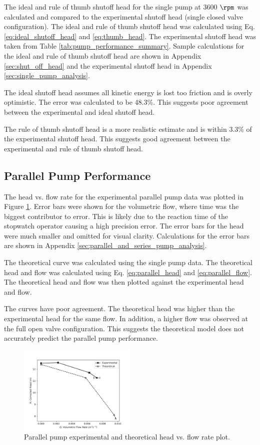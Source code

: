 \noindent The ideal and rule of thumb shutoff head for the single pump at 3600 $\unit{\rpm}$ was calculated and compared to the experimental shutoff head (single closed valve configuration). The ideal and rule of thumb shutoff head was calculated using Eq. \ref{eq:ideal_shutoff_head} and \ref{eq:thumb_head}. The experimental shutoff head was taken from Table \ref{tab:pump_performance_summary}. Sample calculations for the ideal and rule of thumb shutoff head are shown in Appendix \ref{sec:shut_off_head} and the experimental shutoff head in Appendix \ref{sec:single_pump_analysis}.

The ideal shutoff head assumes all kinetic energy is lost too friction and is overly optimistic. The error was calculated to be 48.3\%. This suggests poor agreement between the experimental and ideal shutoff head.

The rule of thumb shutoff head is a more realistic estimate and is within 3.3\% of the experimental shutoff head. This suggests good agreement between the experimental and rule of thumb shutoff head.

\subsection{Parallel Pump Performance}
The head vs. flow rate for the experimental parallel pump data was plotted in Figure \ref{fig:parallel_pump_plot}. Error bars were shown for the volumetric flow, where time was the biggest contributor to error. This is likely due to the reaction time of the stopwatch operator causing a high precision error. The error bars for the head were much smaller and omitted for visual clarity. Calculations for the error bars are shown in Appendix \ref{sec:parallel_and_series_pump_analysis}.

The theoretical curve was calculated using the single pump data. The theoretical head and flow was calculated using Eq. \ref{eq:parallel_head} and \ref{eq:parallel_flow}. The theoretical head and flow was then plotted against the experimental head and flow.

The curves have poor agreement. The theoretical head was higher than the experimental head for the same flow. In addition, a higher flow was observed at the full open valve configuration. This suggests the theoretical model does not accurately predict the parallel pump performance.
\begin{figure}[h]
    \centering
    \includegraphics[width=0.5\textwidth]{Sections/Figures/Parallel Pump Plot.png}
    \caption{Parallel pump experimental and theoretical head vs. flow rate plot.}
    \label{fig:parallel_pump_plot}
\end{figure}

